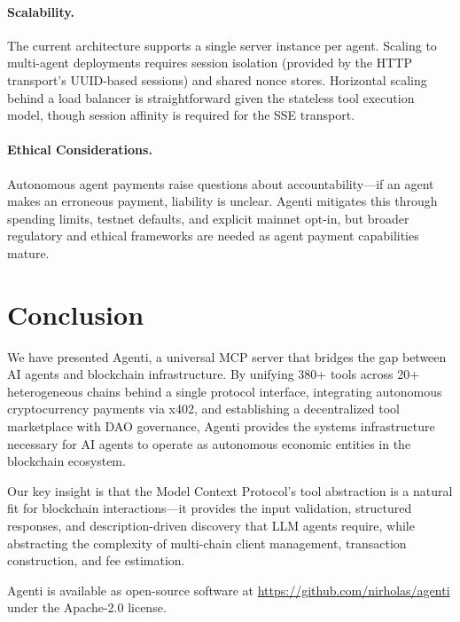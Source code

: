 \documentclass[11pt]{article}
\begin{document}
\paragraph{Scalability.} The current architecture supports a single server instance per agent. Scaling to multi-agent deployments requires session isolation (provided by the HTTP transport's UUID-based sessions) and shared nonce stores. Horizontal scaling behind a load balancer is straightforward given the stateless tool execution model, though session affinity is required for the SSE transport.

\paragraph{Ethical Considerations.} Autonomous agent payments raise questions about accountability---if an agent makes an erroneous payment, liability is unclear. Agenti mitigates this through spending limits, testnet defaults, and explicit mainnet opt-in, but broader regulatory and ethical frameworks are needed as agent payment capabilities mature.

\section{Conclusion}
\label{sec:conclusion}

We have presented Agenti, a universal MCP server that bridges the gap between AI agents and blockchain infrastructure. By unifying 380+ tools across 20+ heterogeneous chains behind a single protocol interface, integrating autonomous cryptocurrency payments via x402, and establishing a decentralized tool marketplace with DAO governance, Agenti provides the systems infrastructure necessary for AI agents to operate as autonomous economic entities in the blockchain ecosystem.

Our key insight is that the Model Context Protocol's tool abstraction is a natural fit for blockchain interactions---it provides the input validation, structured responses, and description-driven discovery that LLM agents require, while abstracting the complexity of multi-chain client management, transaction construction, and fee estimation.

Agenti is available as open-source software at \url{https://github.com/nirholas/agenti} under the Apache-2.0 license.


\end{document}
